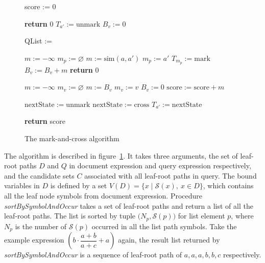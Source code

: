\begin{figure}
\begin{algorithmic}[1]

\State score := 0

\State \textbf{return} 0 
\EndIf
{}
\State $T_{a'} := \mathrm{unmark}$ 
\EndFor
{}
\State $B_v := 0$ 
\EndFor

\State QList := 


\State $m := -\infty$
\State $m_p := \varnothing$
\State $m := \mathrm{sim}(a, a')$ 
\State $m_p := a'$ 
\EndIf
\EndFor
{}
\State $T_{m_p} := \mathrm{mark}$ 
\State $B_v := B_v + m$
\Else
{}
\State \textbf{return} 0 
\EndIf
\EndFor

\label{line_bond_finish}

\State $m := -\infty$
\State $m_v := \varnothing $
\State $m := B_v$ 
\State $m_v := v$ 
\EndIf
\State $B_v := 0$ 
\EndFor
\State $\mathrm{score} := \mathrm{score} + m$ 

\State $\mathrm{nextState} := \mathrm{unmark}$ 
\Else
\State $\mathrm{nextState} := \mathrm{cross}$ 
\EndIf
{}
\State $T_{a'} := \mathrm{nextState}$ 
\EndIf
\EndFor
\EndFor

\EndIf

\EndFor

\State \textbf{return} score
\EndProcedure

\end{algorithmic}
\caption{The mark-and-cross algorithm}\label{markcrossalgo}
\end{figure}

The algorithm is described in figure~\ref{markcrossalgo}. It takes three arguments, the set of leaf-root paths $D$ and $Q$ in document expression and query expression respectively, and the candidate sets $C$ associated with all leaf-root paths in query. 
The bound variables in $D$ is defined by a set $V(D) = \{x \mid \mathcal{S}(x),\ x \in D\}$, which contains all the leaf node symbols from document expression.
Procedure \textit{sortBySymbolAndOccur} takes a set of leaf-root paths and return a list of all the leaf-root paths. 
The list is sorted by tuple $\big(N_p, \mathcal{S}(p)\big)$ for list element $p$, where $N_p$ is the number of $\mathcal{S}(p)$ occurred in all the list path symbols. 
Take the example expression $\left(b \cdot \dfrac{a+b}{a+c} + a\right)$ again, the result list returned by \textit{sortBySymbolAndOccur} is a sequence of leaf-root path of $a,a,a,b,b,c$ respectively.

